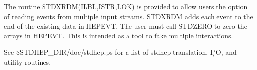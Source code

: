 \vspace{0.2 in}

The routine STDXRDM(ILBL,ISTR,LOK) is provided to allow users the option
of reading events from multiple input streams.  
STDXRDM adds each event to the end of the existing
data in HEPEVT.  The user must call STDZERO to zero the arrays in HEPEVT.
This is intended as a tool to fake multiple interactions.

See \$STDHEP\_DIR/doc/stdhep.ps for a list of stdhep translation,
I/O, and utility routines.



